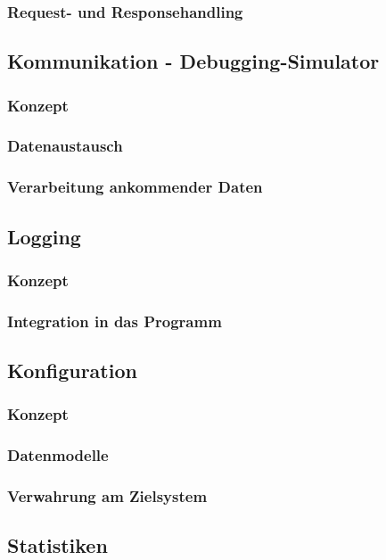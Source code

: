 \subsubsection{Request- und Responsehandling}

\subsection{Kommunikation - Debugging-Simulator}\label{subsec:kommunikation---debugging-simulator}
\subsubsection{Konzept}
\subsubsection{Datenaustausch}
\subsubsection{Verarbeitung ankommender Daten}
\subsection{Logging}
\subsubsection{Konzept}
\subsubsection{Integration in das Programm}
\subsection{Konfiguration}\label{subsec:konfiguration}
\subsubsection{Konzept}
\subsubsection{Datenmodelle}
\subsubsection{Verwahrung am Zielsystem}

\subsection{Statistiken}
